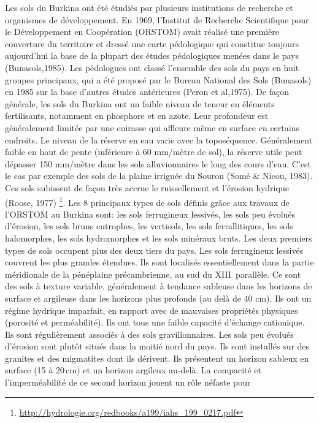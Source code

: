 \documentclass[a4paper,11pt]{article}
\begin{document}
Les sols du Burkina ont été étudiés par plusieurs institutions de
recherche et organismes de développement. En 1969, l'Institut de
Recherche Scientifique pour le Développement en Coopération (ORSTOM)
avait réalisé une première couverture du territoire et dressé une
carte pédologique qui constitue toujours aujourd'hui la base de la
plupart des études pédologiques menées dans le pays
(Bunasols,1985). Les pédologues ont classé l'ensemble des sols du pays
en huit groupes principaux, qui a été proposé par le Bureau National
des Sols (Bunasols) en 1985 sur la base d'autres études antérieures
(Peron et al,1975). De façon générale, les sols du Burkina ont un
faible niveau de teneur en éléments fertilisants, notamment en
phosphore et en azote. Leur profondeur est généralement limitée par une
cuirasse qui affleure même en surface en certains endroits. Le niveau
de la réserve en eau varie avec la toposéquence. Généralement faible
en haut de pente (inférieure à 60 mm/mètre de sol), la réserve utile
peut dépasser 150 mm/mètre dans les sols alluvionnaires le long des
cours d'eau. C'est le cas par exemple des sols de la plaine irriguée
du Sourou (Somé \& Nicou, 1983). Ces sols subissent de façon très accrue
le ruissellement et l'érosion hydrique (Roose, 1977)
\footnote{\url{http://hydrologie.org/redbooks/a199/iahs_199_0217.pdf}}. Les
8 principaux types de sols définis grâce aux travaux de l'ORSTOM au
Burkina sont: les sols ferrugineux lessivés, les sols peu évolués
d’érosion, les sols bruns eutrophes, les vertisols, les sols
ferrallitiques, les sols halomorphes, les sols hydromorphes et les
sols minéraux bruts. Les deux premiers types de sols occupent plus des
deux tiers du pays. Les sols ferrugineux lessivés couvrent les plus
grandes étendues. Ils sont localisés essentiellement dans la partie
méridionale de la pénéplaine précambrienne, au sud du XIII\ieme\,
parallèle. Ce sont des sols à texture variable, généralement à
tendance sableuse dans les horizons de surface et argileuse dans les
horizons plus profonds (au delà de 40 cm). Ils ont un régime hydrique
imparfait, en rapport avec de mauvaises propriétés physiques (porosité
et perméabilité). Ils ont tous une faible capacité d’échange
cationique. Ils sont régulièrement associés à des sols
gravillonnaires. Les sols peu évolués d’érosion sont plutôt situés
dans la moitié nord du pays. Ils sont installés sur des granites et
des migmatites dont ils dérivent. Ils présentent un horizon sableux en
surface (15 à 20\,cm) et un horizon argileux au-delà. La compacité et
l’imperméabilité de ce second horizon jouent un rôle néfaste pour
\end{document}
